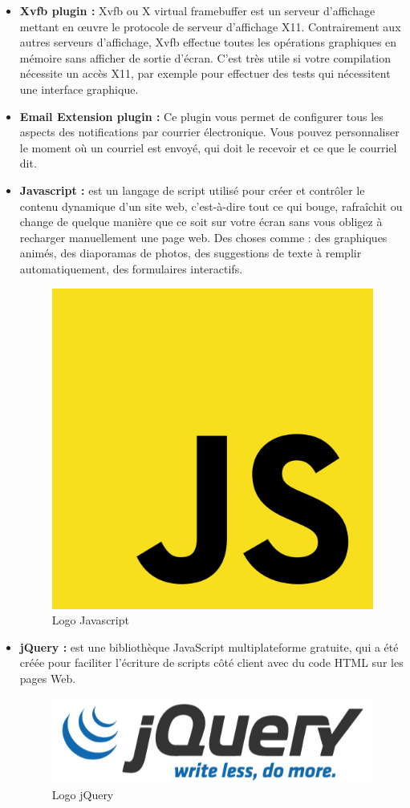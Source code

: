 \begin{itemize}
	\item \textbf{Xvfb plugin\cite{xvfb} : } Xvfb ou X virtual framebuffer est un serveur d'affichage mettant en œuvre le protocole de serveur d'affichage X11. Contrairement aux autres serveurs d'affichage, Xvfb effectue toutes les opérations graphiques en mémoire sans afficher de sortie d'écran. C'est très utile si votre compilation nécessite un accès X11, par exemple pour effectuer des tests qui nécessitent une interface graphique.
	\item \textbf{Email Extension plugin\cite{emailextension} :} Ce plugin vous permet de configurer tous les aspects des notifications par courrier électronique. Vous pouvez personnaliser le moment où un courriel est envoyé, qui doit le recevoir et ce que le courriel dit.
	\item \textbf{Javascript\cite{js} :} est un langage de script utilisé pour créer et contrôler le contenu dynamique d'un site web, c'est-à-dire tout ce qui bouge, rafraîchit ou change de quelque manière que ce soit sur votre écran sans vous obligez à recharger manuellement une page web. Des choses comme : des graphiques animés, des diaporamas de photos, des suggestions de texte à remplir automatiquement, des formulaires interactifs.
	\begin{figure}[H]
		\centering
		\includegraphics[width=0.13\linewidth]{img/logos/js}
		\caption[Logo Javascript]{Logo Javascript}
		\label{fig:js}
	\end{figure}
	
	\item \textbf{jQuery\cite{jquery} :} est une bibliothèque JavaScript multiplateforme gratuite, qui a été créée pour faciliter l'écriture de scripts côté client avec du code HTML sur les pages Web.
	\begin{figure}[H]
		\centering
		\includegraphics[width=0.3\linewidth]{img/logos/jquery}
		\caption[Logo jQuery]{Logo jQuery}
		\label{fig:jquery}
	\end{figure}
	

\end{itemize}
